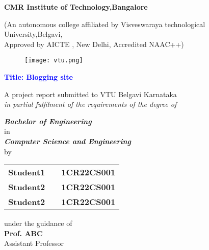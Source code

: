\documentclass{article}
\begin{document}
\vspace*{-0.75in}
\thispagestyle{empty}

\centering

\begin{LARGE}
   \textbf{CMR Institute of Technology,Bangalore}\\
\end{LARGE}

\begin{small}
    (An autonomous college affiliated by Visveswaraya technological University,Belgavi,\\ Approved by AICTE , New Delhi, Accredited NAAC++)
\end{small}

\begin{figure}[h]
    \centering
    \texttt{[image: vtu.png]}
\end{figure}

\begin{LARGE}
    \textbf{\textcolor{blue}{Title: Blogging site\\}}
\end{LARGE}
\vspace{0.2cm}
\begin{small}
    A project report submitted to VTU Belgavi Karnataka\\
    \textit{in partial fulfilment of the requirements of the degree of}
\end{small}

\vspace{0.5cm}

\textbf{\textit{Bachelor of Engineering}}\\
in\\
\textbf{\textit{Computer Science and Engineering}}\\
by\\ 
\vspace{0.5cm}

\begin{tabular}{ccc}
    \textbf{Student1}& & \textbf{1CR22CS001}\\
    \textbf{Student2}& & \textbf{1CR22CS001}\\
    \textbf{Student2}& & \textbf{1CR22CS001}\\
\end{tabular}
\vspace{0.5cm}


under the guidance of\\
\textbf{Prof. ABC}\\
Assistant Professor\\
\end{document}
